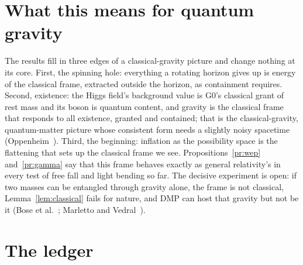 \documentclass[11pt,a4paper]{article}
\theoremstyle{definition}
\begin{document}
\section{What this means for quantum gravity}\label{sec:qg}

The results fill in three edges of a classical-gravity picture and change nothing at its core. First, the spinning hole: everything a
rotating horizon gives up is energy of the classical frame, extracted outside the horizon, as containment requires. Second, existence: the
Higgs field's background value is G0's classical grant of rest mass and its boson is quantum content, and gravity is the classical frame that
responds to all existence, granted and contained; that is the classical-gravity, quantum-matter picture whose consistent form needs a
slightly noisy spacetime (Oppenheim~\cite{oppenheim}). Third, the beginning: inflation as the possibility space is the flattening that sets
up the classical frame we see. Propositions~\ref{pr:wep} and~\ref{pr:gamma} say that this frame behaves exactly as general relativity's in
every test of free fall and light bending so far. The decisive experiment is open: if two masses can be entangled through gravity alone, the
frame is not classical, Lemma~\ref{lem:classical} fails for nature, and DMP can host that gravity but not be it (Bose et
al.~\cite{bose}; Marletto and Vedral~\cite{mv}).

\section{The ledger}\label{sec:ledger}
\end{document}
